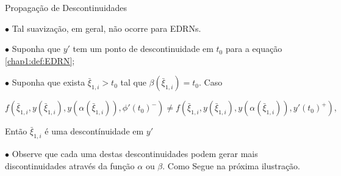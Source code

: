 \documentclass{beamer}
\theoremstyle{plain}
\theoremstyle{definition}
\begin{document}

\begin{frame}{Propagação de Descontinuidades}
     
    $\bullet$ Tal suavização, em geral, não ocorre para EDRNs. 

    $\bullet$ Suponha que $y'$ tem um ponto de descontinuidade em $t_0$ para a equação \ref{chap1:def:EDRN};

    $\bullet$ Suponha que exista $\bar{\xi}_{1, i} > t_0$ tal que $\beta(\bar{\xi}_{1, i}) = t_0$. Caso

    \footnotesize
    \begin{equation}
        f(\bar{\xi}_{1, i}, y(\bar{\xi}_{1, i}), y(\alpha(\bar{\xi}_{1, i})), \phi'(t_0)^-) \neq 
        f(\bar{\xi}_{1, i}, y(\bar{\xi}_{1, i}), y(\alpha(\bar{\xi}_{1, i})), y'(t_0)^+),
        \label{chap2:eq:disco:edrn}
    \end{equation}

    \normalsize
    Então $\bar{\xi}_{1, i}$ é uma descontínuidade em $y'$

    $\bullet$ Observe que cada uma destas descontinuidades podem gerar mais discontinuidades através da função $\alpha$ ou $\beta$. Como Segue na próxima ilustração.

\end{frame}

\end{document}

